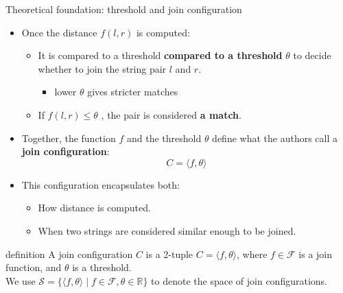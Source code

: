 \documentclass[8pt]{beamer} %
\begin{document}
\begin{frame}{Theoretical foundation: threshold and join configuration}
		
	\begin{itemize}
		\item Once the distance $f(l, r)$ is computed:
		\begin{itemize}
			\item It is compared to a threshold \textbf{compared to a threshold} $\theta$  to decide whether to join the string pair $l$ and $r$.
			\begin{itemize}
				\item lower $\theta$ gives stricter matches
			\end{itemize}
			\item If $f(l, r) \leq \theta$ , the pair is considered \textbf{a match}.
		\end{itemize}
		\item 	Together, the function $f$ and the threshold $\theta$ define what the authors call a \textbf{join configuration}:$$
		C = \langle f, \theta \rangle
		$$
		\item This configuration encapsulates both:
		\begin{itemize}
			\item How distance is computed.
			\item When two strings are considered similar enough to be joined.
		\end{itemize}
	\end{itemize}	
	
	\vspace{1em}
	
	\begin{beamercolorbox}[rounded=true, shadow=true, leftskip=1em, rightskip=1em]{definition}
		A join configuration $C$ is a 2-tuple $C = \langle f, \theta \rangle$, where $f \in \mathcal{F}$ is a join function, and $\theta$ is a threshold.\\
		We use $\mathcal{S} = \{ \langle f, \theta \rangle \mid f \in \mathcal{F}, \theta \in \mathbb{R} \}$ to denote the space of join configurations.
	\end{beamercolorbox}

\end{frame}
\end{document}
